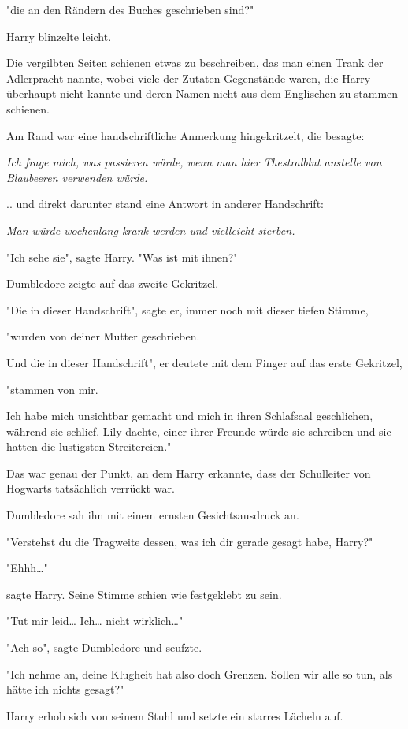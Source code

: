 {"die an den Rändern des Buches geschrieben sind?"

Harry blinzelte leicht.

Die vergilbten Seiten schienen etwas zu beschreiben, das man einen Trank der Adlerpracht nannte, wobei viele der Zutaten Gegenstände waren, die Harry überhaupt nicht kannte und deren Namen nicht aus dem Englischen zu stammen schienen.

Am Rand war eine handschriftliche Anmerkung hingekritzelt, die besagte:

\emph{Ich frage mich, was passieren würde, wenn man hier Thestralblut anstelle von Blaubeeren verwenden würde.}

.. und direkt darunter stand eine Antwort in anderer Handschrift:

\emph{Man würde wochenlang krank werden und vielleicht sterben.}

"Ich sehe sie", sagte Harry. "Was ist mit ihnen?"

Dumbledore zeigte auf das zweite Gekritzel.

"Die in dieser Handschrift", sagte er, immer noch mit dieser tiefen Stimme,

"wurden von deiner Mutter geschrieben.

Und die in dieser Handschrift", er deutete mit dem Finger auf das erste Gekritzel,

"stammen von mir.

Ich habe mich unsichtbar gemacht und mich in ihren Schlafsaal geschlichen, während sie schlief. Lily dachte, einer ihrer Freunde würde sie schreiben und sie hatten die lustigsten Streitereien."

Das war genau der Punkt, an dem Harry erkannte, dass der Schulleiter von Hogwarts tatsächlich verrückt war.

Dumbledore sah ihn mit einem ernsten Gesichtsausdruck an.

"Verstehst du die Tragweite dessen, was ich dir gerade gesagt habe, Harry?"

"Ehhh…"

sagte Harry. Seine Stimme schien wie festgeklebt zu sein.

"Tut mir leid… Ich… nicht wirklich…"

"Ach so", sagte Dumbledore und seufzte.

"Ich nehme an, deine Klugheit hat also doch Grenzen. Sollen wir alle so tun, als hätte ich nichts gesagt?"

Harry erhob sich von seinem Stuhl und setzte ein starres Lächeln auf.

}
